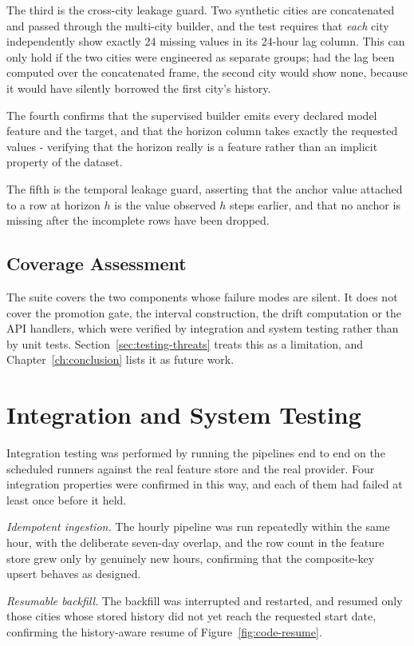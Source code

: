The third is the cross-city leakage guard. Two synthetic cities are concatenated
and passed through the multi-city builder, and the test requires that
\emph{each} city independently show exactly 24 missing values in its 24-hour lag
column. This can only hold if the two cities were engineered as separate groups;
had the lag been computed over the concatenated frame, the second city would show
none, because it would have silently borrowed the first city's history.

The fourth confirms that the supervised builder emits every declared model
feature and the target, and that the horizon column takes exactly the requested
values - verifying that the horizon really is a feature rather than an implicit
property of the dataset.

The fifth is the temporal leakage guard, asserting that the anchor value attached
to a row at horizon $h$ is the value observed $h$ steps earlier, and that no
anchor is missing after the incomplete rows have been dropped.

\subsection{Coverage Assessment}
The suite covers the two components whose failure modes are silent. It does not
cover the promotion gate, the interval construction, the drift computation or the
API handlers, which were verified by integration and system testing rather than
by unit tests. Section~\ref{sec:testing-threats} treats this as a limitation, and
Chapter~\ref{ch:conclusion} lists it as future work.

\section{Integration and System Testing}
Integration testing was performed by running the pipelines end to end on the
scheduled runners against the real feature store and the real provider. Four
integration properties were confirmed in this way, and each of them had failed at
least once before it held.

\emph{Idempotent ingestion.} The hourly pipeline was run repeatedly within the
same hour, with the deliberate seven-day overlap, and the row count in the feature
store grew only by genuinely new hours, confirming that the composite-key upsert
behaves as designed.

\emph{Resumable backfill.} The backfill was interrupted and restarted, and
resumed only those cities whose stored history did not yet reach the requested
start date, confirming the history-aware resume of
Figure~\ref{fig:code-resume}.


